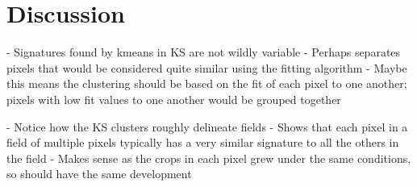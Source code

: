 \chapter{Discussion}

- Signatures found by kmeans in KS are not wildly variable
  - Perhaps separates pixels that would be considered quite similar using the fitting algorithm
  - Maybe this means the clustering should be based on the fit of each pixel to one another; pixels with low fit values to one another would be grouped together
  
- Notice how the KS clusters roughly delineate fields 
  - Shows that each pixel in a field of multiple pixels typically has a very similar signature to all the others in the field
  - Makes sense as the crops in each pixel grew under the same conditions, so should have the same development
  